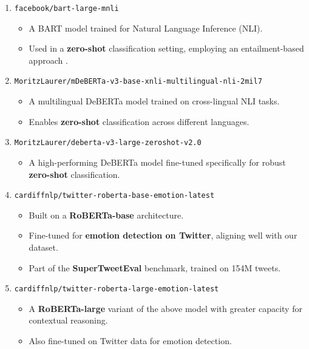 \begin{enumerate}
    \item \texttt{facebook/bart-large-mnli} \cite{lewis2019bartdenoisingsequencetosequencepretraining}
    \begin{itemize}
        \item A BART model trained for Natural Language Inference (NLI).
        \item Used in a \textbf{zero-shot} classification setting, employing an entailment-based approach \cite{DBLP:journals/corr/abs-1909-00161}.
    \end{itemize}
    
    \item \texttt{MoritzLaurer/mDeBERTa-v3-base-xnli-multilingual-nli-2mil7} \cite{laurer_less_2022}
    \begin{itemize}
        \item A multilingual DeBERTa model trained on cross-lingual NLI tasks.
        \item Enables \textbf{zero-shot} classification across different languages.
    \end{itemize}
    
    \item \texttt{MoritzLaurer/deberta-v3-large-zeroshot-v2.0} \cite{laurer_building_2023}
    \begin{itemize}
        \item A high-performing DeBERTa model fine-tuned specifically for robust \textbf{zero-shot} classification.
    \end{itemize}
    
    \item \texttt{cardiffnlp/twitter-roberta-base-emotion-latest} \cite{antypas2023supertweetevalchallengingunifiedheterogeneous}
    \begin{itemize}
        \item Built on a \textbf{RoBERTa-base} architecture.
        \item Fine-tuned for \textbf{emotion detection on Twitter}, aligning well with our dataset.
        \item Part of the \textbf{SuperTweetEval} benchmark, trained on 154M tweets.
    \end{itemize}
    
    \item \texttt{cardiffnlp/twitter-roberta-large-emotion-latest} \cite{antypas2023supertweetevalchallengingunifiedheterogeneous}
    \begin{itemize}
        \item A \textbf{RoBERTa-large} variant of the above model with greater capacity for contextual reasoning.
        \item Also fine-tuned on Twitter data for emotion detection.
    \end{itemize}
\end{enumerate}


